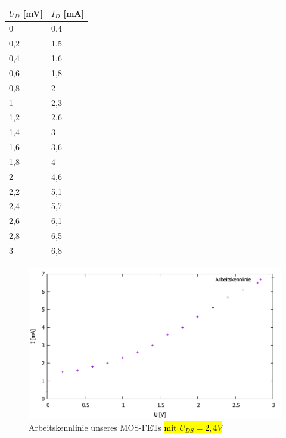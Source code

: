 \documentclass{scrartcl}
\begin{document}
\begin{table}[H]
\begin{center}
\begin{tabular}{l|l}
$U_D$ [mV]   &   $I_D$ [mA] \\
\hline
0	&0,4\\
0,2	&1,5\\
0,4	&1,6\\
0,6	&1,8\\
0,8	&2\\
1	&2,3\\
1,2	&2,6\\
1,4	&3\\
1,6	&3,6\\
1,8	&4\\
2	&4,6\\
2,2	&5,1\\
2,4	&5,7\\
2,6	&6,1\\
2,8	&6,5\\
3	&6,8\\
\end{tabular}
\end{center}
\label{tab:mosfet_UD}
\end{table}

\begin{figure}[H]
  \centering
    \includegraphics[scale=0.5]{v4_arbeit.pdf}
  \caption{Arbeitskennlinie unseres MOS-FETs \hl{mit $U_{DS}=2,4V$}}
  \label{fig:Kennlinie_S_Source}
\end{figure}
\end{document}
